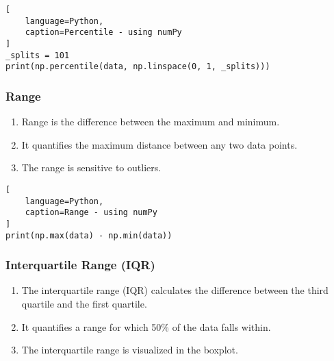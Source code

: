 \begin{lstlisting}[
    language=Python, 
    caption=Percentile - using numPy
]
_splits = 101
print(np.percentile(data, np.linspace(0, 1, _splits)))
\end{lstlisting}


\subsubsection{Range \cite{statistics/book/Statistics-for-Data-Scientists/Maurits-Kaptein}} \label{Data/Describing Data/Central Tendency/Range}

\begin{enumerate}
    \item Range is the difference between the maximum and minimum. \hfill \cite{statistics/book/Statistics-for-Data-Scientists/Maurits-Kaptein}
    
    \item It quantifies the maximum distance between any two data points. \hfill \cite{statistics/book/Statistics-for-Data-Scientists/Maurits-Kaptein}

    \item The range is sensitive to outliers. \hfill \cite{statistics/book/Statistics-for-Data-Scientists/Maurits-Kaptein}
\end{enumerate}


\begin{lstlisting}[
    language=Python, 
    caption=Range - using numPy
]
print(np.max(data) - np.min(data))
\end{lstlisting}


\subsubsection{Interquartile Range (IQR) \cite{statistics/book/Statistics-for-Data-Scientists/Maurits-Kaptein}} \label{Data/Describing Data/Central Tendency/Interquartile Range (IQR)}

\begin{enumerate}
    \item The interquartile range (IQR) calculates the difference between the third quartile and the first quartile. \hfill \cite{statistics/book/Statistics-for-Data-Scientists/Maurits-Kaptein}

    \item It quantifies a range for which 50\% of the data falls within. \hfill \cite{statistics/book/Statistics-for-Data-Scientists/Maurits-Kaptein}

    \item The interquartile range is visualized in the boxplot. \hfill \cite{statistics/book/Statistics-for-Data-Scientists/Maurits-Kaptein}
\end{enumerate}

